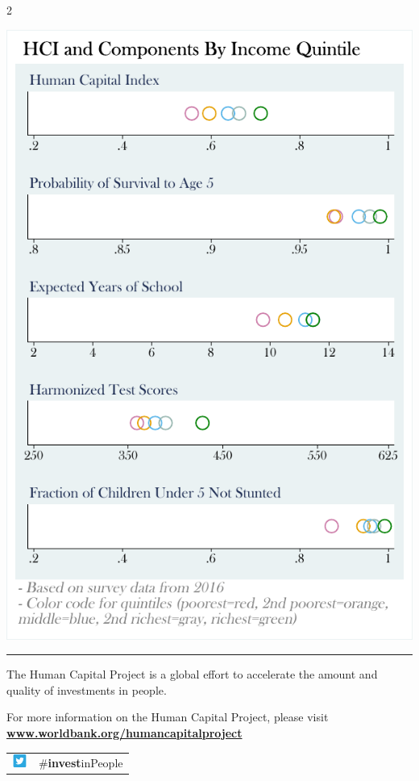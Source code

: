 \documentclass[8pt,]{article}
\begin{document}
\begin {multicols}{2}
\begin{flushright}\includegraphics[width=1\linewidth]{charts/ses_PRY} \end{flushright}

\noindent

\rule{9cm}{0.4pt}

The Human Capital Project is a global effort to accelerate the amount
and quality of investments in people. ~

For more information on the Human Capital Project, please visit
\textbf{\href{https://www.worldbank.org/humancapitalproject}{www.worldbank.org/humancapitalproject}}

\begin{table}[H]
\begin{tabular}{ll}
\includegraphics[width=0.5cm]{static/twitter.png} & \#\textbf{invest}inPeople   \\
\end{tabular}
\end{table}

\end {multicols}
\end{document}
